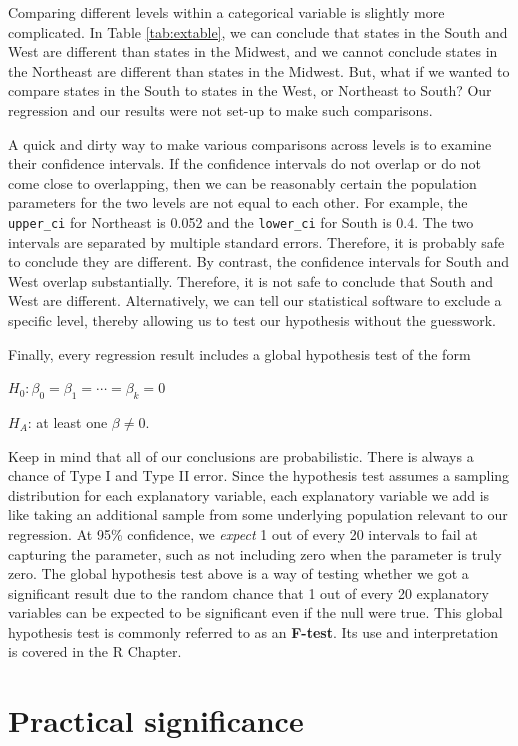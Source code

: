 \documentclass[
]{book}
\begin{document}
Comparing different levels within a categorical variable is slightly more complicated. In Table \ref{tab:extable}, we can conclude that states in the South and West are different than states in the Midwest, and we cannot conclude states in the Northeast are different than states in the Midwest. But, what if we wanted to compare states in the South to states in the West, or Northeast to South? Our regression and our results were not set-up to make such comparisons.

A quick and dirty way to make various comparisons across levels is to examine their confidence intervals. If the confidence intervals do not overlap or do not come close to overlapping, then we can be reasonably certain the population parameters for the two levels are not equal to each other. For example, the \texttt{upper\_ci} for Northeast is 0.052 and the \texttt{lower\_ci} for South is 0.4. The two intervals are separated by multiple standard errors. Therefore, it is probably safe to conclude they are different. By contrast, the confidence intervals for South and West overlap substantially. Therefore, it is not safe to conclude that South and West are different. Alternatively, we can tell our statistical software to exclude a specific level, thereby allowing us to test our hypothesis without the guesswork.

Finally, every regression result includes a global hypothesis test of the form

\(H_0: \beta_0 = \beta_1 = \cdots = \beta_k = 0\)

\(H_A\): at least one \(\beta \neq 0\).

Keep in mind that all of our conclusions are probabilistic. There is always a chance of Type I and Type II error. Since the hypothesis test assumes a sampling distribution for each explanatory variable, each explanatory variable we add is like taking an additional sample from some underlying population relevant to our regression. At 95\% confidence, we \emph{expect} 1 out of every 20 intervals to fail at capturing the parameter, such as not including zero when the parameter is truly zero. The global hypothesis test above is a way of testing whether we got a significant result due to the random chance that 1 out of every 20 explanatory variables can be expected to be significant even if the null were true. This global hypothesis test is commonly referred to as an \textbf{F-test}. Its use and interpretation is covered in the R Chapter.

\hypertarget{practical-significance}{%
\section{Practical significance}\label{practical-significance}}
\end{document}
